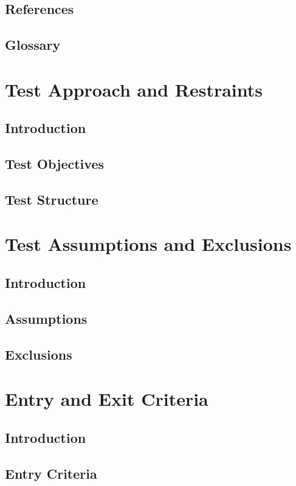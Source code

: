 \documentclass{article}
\begin{document}
\subsection{References}
\subsection{Glossary}

\section{Test Approach and Restraints} %

\subsection{Introduction}
\subsection{Test Objectives}
\subsection{Test Structure}

\section{Test Assumptions and Exclusions} %

\subsection{Introduction}
\subsection{Assumptions}
\subsection{Exclusions}

\section{Entry and Exit Criteria} %

\subsection{Introduction}
\subsection{Entry Criteria}
\end{document}
